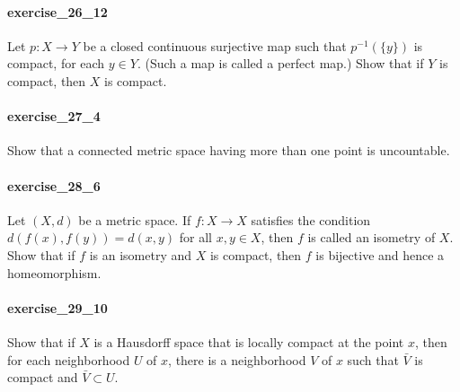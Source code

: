 \documentclass{article}
\begin{document}
\paragraph{exercise\_26\_12} Let $p: X \rightarrow Y$ be a closed continuous surjective map such that $p^{-1}(\{y\})$ is compact, for each $y \in Y$. (Such a map is called a perfect map.) Show that if $Y$ is compact, then $X$ is compact.

\paragraph{exercise\_27\_4} Show that a connected metric space having more than one point is uncountable.

\paragraph{exercise\_28\_6} Let $(X, d)$ be a metric space. If $f: X \rightarrow X$ satisfies the condition $d(f(x), f(y))=d(x, y)$ for all $x, y \in X$, then $f$ is called an isometry of $X$. Show that if $f$ is an isometry and $X$ is compact, then $f$ is bijective and hence a homeomorphism.

\paragraph{exercise\_29\_10} Show that if $X$ is a Hausdorff space that is locally compact at the point $x$, then for each neighborhood $U$ of $x$, there is a neighborhood $V$ of $x$ such that $\bar{V}$ is compact and $\bar{V} \subset U$.
\end{document}
